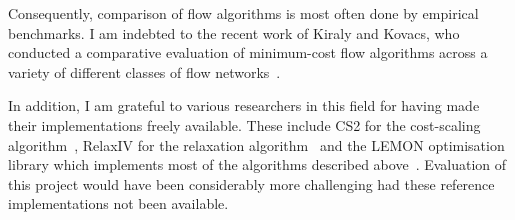 Consequently, comparison of flow algorithms is most often done by empirical benchmarks. I am indebted to the recent work of Kiraly and Kovacs, who conducted a comparative evaluation of minimum-cost flow algorithms across a variety of different classes of flow networks~\cite{KiralyKovacs:2012,Kovacs:2015}.

In addition, I am grateful to various researchers in this field for having made their implementations freely available. These include CS2 for the cost-scaling algorithm~\cite{CS2:2009}, RelaxIV for the relaxation algorithm~\cite{RelaxIV:2011} and the LEMON optimisation library which implements most of the algorithms described above~\cite{LEMON:2011,LEMON:Software}. Evaluation of this project would have been considerably more challenging had these reference implementations not been available.

